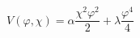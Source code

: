\begin{equation}                                             \label{4*}
V(\varphi ,\chi)=\alpha\frac{\chi ^2\varphi^2}{2}+\lambda\frac{\varphi ^4}{4}
\end{equation}

